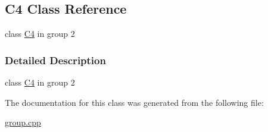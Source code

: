\hypertarget{class_c4}{}\subsection{C4 Class Reference}
\label{class_c4}


class \hyperlink{class_c4}{C4} in group 2  




\subsubsection{Detailed Description}
class \hyperlink{class_c4}{C4} in group 2 

The documentation for this class was generated from the following file\+:\begin{DoxyCompactItemize}
\item 
\hyperlink{group_8cpp}{group.\+cpp}\end{DoxyCompactItemize}
